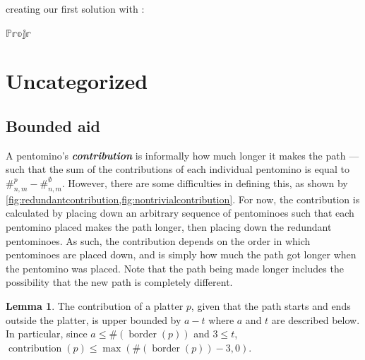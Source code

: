 \documentclass{article}
\newcommand{\pentU}{\smash{\colorbox{colorU!50}{U}}}
\theoremstyle{definition}%
\newtheorem{lemma}[theorem]{Lemma}
\newcommand{\newterm}[1]{\textbf{\textit{#1}}}
\newcommand{\border}{\operatorname{border}}
\newcommand{\contribution}{\operatorname{contribution}}
\begin{document}
creating our first solution with \pentU{}:

\begin{center}
\end{center}

$\mathbb{Proj}\mathbb{r}$






\clearpage
\section{Uncategorized}

\subsection{Bounded aid}
A pentomino's \newterm{contribution} is informally how much longer it makes the path --- such that the sum of the contributions of each individual pentomino is equal to $\#^p_{n, m} - \#^{\emptyset}_{n, m}$. However, there are some difficulties in defining this, as shown by \cref{fig:redundantcontribution,fig:nontrivialcontribution}. For now, the contribution is calculated by placing down an arbitrary sequence of pentominoes such that each pentomino placed makes the path longer, then placing down the redundant pentominoes. As such, the contribution depends on the order in which pentominoes are placed down, and is simply how much the path got longer when the pentomino was placed. Note that the path being made longer includes the possibility that the new path is completely different.

\begin{lemma}
The contribution of a platter $p$, given that the path starts and ends outside the platter, is upper bounded by $a - t$ where $a$ and $t$ are described below. In particular, since $a \le \#(\border(p))$ and $3 \le t$, $\contribution(p) \le \max(\#(\border(p)) - 3, 0)$.
\end{lemma}
\end{document}
